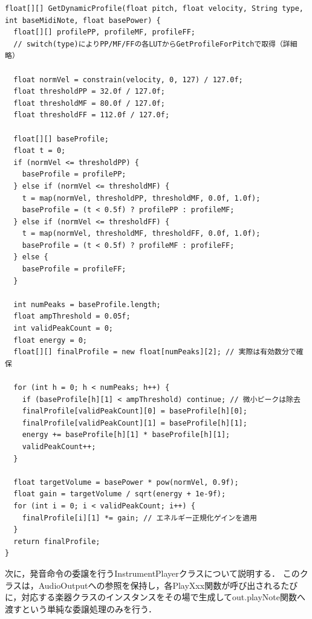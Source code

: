 \begin{lstlisting}[caption={DataUtils::GetDynamicProfile関数（要部）}, label={lst:gakki_getdynamic}]
float[][] GetDynamicProfile(float pitch, float velocity, String type, int baseMidiNote, float basePower) {
  float[][] profilePP, profileMF, profileFF;
  // switch(type)によりPP/MF/FFの各LUTからGetProfileForPitchで取得（詳細略）

  float normVel = constrain(velocity, 0, 127) / 127.0f;
  float thresholdPP = 32.0f / 127.0f;
  float thresholdMF = 80.0f / 127.0f;
  float thresholdFF = 112.0f / 127.0f;

  float[][] baseProfile;
  float t = 0;
  if (normVel <= thresholdPP) {
    baseProfile = profilePP;
  } else if (normVel <= thresholdMF) {
    t = map(normVel, thresholdPP, thresholdMF, 0.0f, 1.0f);
    baseProfile = (t < 0.5f) ? profilePP : profileMF;
  } else if (normVel <= thresholdFF) {
    t = map(normVel, thresholdMF, thresholdFF, 0.0f, 1.0f);
    baseProfile = (t < 0.5f) ? profileMF : profileFF;
  } else {
    baseProfile = profileFF;
  }

  int numPeaks = baseProfile.length;
  float ampThreshold = 0.05f;
  int validPeakCount = 0;
  float energy = 0;
  float[][] finalProfile = new float[numPeaks][2]; // 実際は有効数分で確保

  for (int h = 0; h < numPeaks; h++) {
    if (baseProfile[h][1] < ampThreshold) continue; // 微小ピークは除去
    finalProfile[validPeakCount][0] = baseProfile[h][0];
    finalProfile[validPeakCount][1] = baseProfile[h][1];
    energy += baseProfile[h][1] * baseProfile[h][1];
    validPeakCount++;
  }

  float targetVolume = basePower * pow(normVel, 0.9f);
  float gain = targetVolume / sqrt(energy + 1e-9f);
  for (int i = 0; i < validPeakCount; i++) {
    finalProfile[i][1] *= gain; // エネルギー正規化ゲインを適用
  }
  return finalProfile;
}
\end{lstlisting}

\fi

次に，発音命令の委譲を行うInstrumentPlayerクラスについて説明する．
このクラスは，AudioOutputへの参照を保持し，各PlayXxx関数が呼び出されるたびに，対応する楽器クラスのインスタンスをその場で生成してout.playNote関数へ渡すという単純な委譲処理のみを行う．





